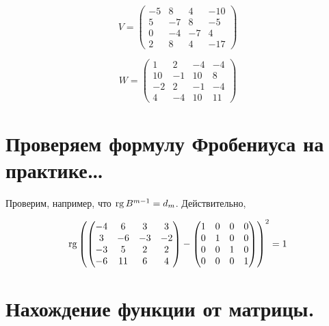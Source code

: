 \documentclass[12pt, a4paper]{article}
\begin{document}
\begin{statement}
        \begin{equation}
            V = \left(\begin{matrix}
                -5 & 8 & 4 & -10 \\
                5 & -7 & 8 & -5 \\
                0 & -4 & -7 & 4 \\
                2 & 8 & 4 & -17
            \end{matrix}\right)
        \end{equation}

        
        \begin{equation}
            W = \left(\begin{matrix}
                1 & 2 & -4 & -4 \\
                10 & -1 & 10 & 8 \\
                -2 & 2 & -1 & -4 \\
                4 & -4 & 10 & 11
            \end{matrix}\right)
        \end{equation}
    \end{statement}

    \section{Проверяем формулу Фробениуса на практике…}

    Проверим, например, что $\operatorname{rg} B^{m - 1} = d_m$.
    Действительно, 

    \begin{equation}
        \operatorname{rg} \left( \left(\begin{matrix}
            -4 & 6 & 3 & 3 \\
            3 & -6 & -3 & -2 \\
            -3 & 5 & 2 & 2 \\
            -6 & 11 & 6 & 4
        \end{matrix}\right) - \left(\begin{matrix}
            1 & 0 & 0 & 0 \\
            0 & 1 & 0 & 0 \\
            0 & 0 & 1 & 0 \\
            0 & 0 & 0 & 1
            \end{matrix}\right) \right)^2 = 1
    \end{equation}

    \section{Нахождение функции от матрицы.}
\end{document}
